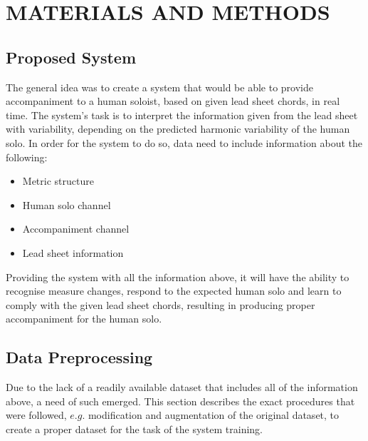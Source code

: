 \chapter{MATERIALS AND METHODS} \label{chapter:materials_methods}
    \section{Proposed System} \label{sec:proposed_system}
    The general idea was to create a system that would be able to provide accompaniment to a human soloist, based on given lead sheet chords, in real time. The system's task is to interpret the information given from the lead sheet with variability, depending on the predicted harmonic variability of the human solo. In order for the system to do so, data need to include information about the following:
    
    \begin{itemize}
        \item Metric structure
        \item Human solo channel
        \item Accompaniment channel
        \item Lead sheet information
    \end{itemize}
    
    Providing the system with all the information above, it will have the ability to recognise measure changes, respond to the expected human solo and learn to comply with the given lead sheet chords, resulting in producing proper accompaniment for the human solo.

    \section{Data Preprocessing}
    Due to the lack of a readily available dataset that includes all of the information above, a need of such emerged. This section describes the exact procedures that were followed, $e.g.$ modification and augmentation of the original dataset, to create a proper dataset for the task of the system training.

